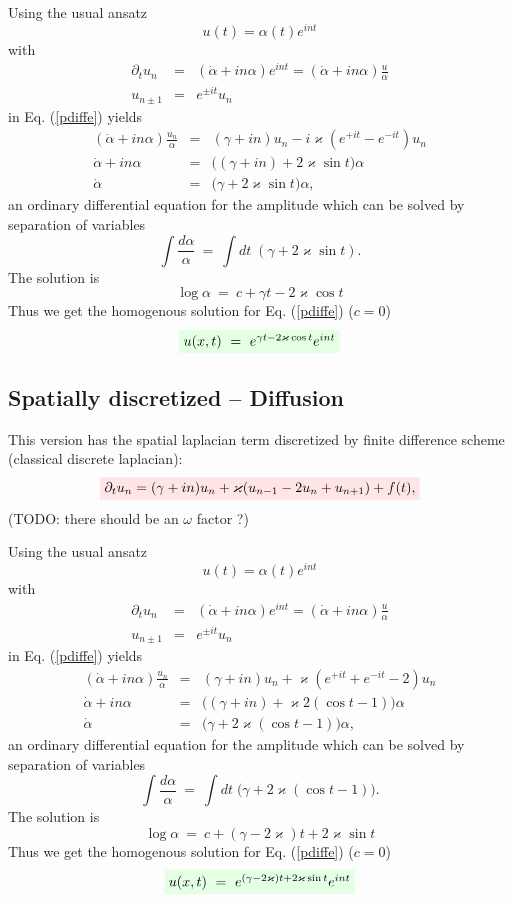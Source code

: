 \documentclass[11pt,twocolumn]{article}
\newcommand{\be}{\begin{equation}}
\newcommand{\ee}{\end{equation}}
\newcommand{\bea}{\begin{eqnarray*}}
\newcommand{\eea}{\end{eqnarray*}}
\newcommand{\w}{\omega}
\newcommand{\ka}{\varkappa}
\newcommand{\rbox}[1]{\colorbox{red!10}{$#1$}}
\newcommand{\gbox}[1]{\colorbox{green!10}{$#1$}}
\begin{document}
Using the usual ansatz
\be
   u(t) = \alpha(t) e^{int}
\ee
with
\bea
    \partial_t u_n       &=&  ( \dot{\alpha} + in\alpha ) e^{int} = ( \dot{\alpha} + in\alpha ) \frac{u}{\alpha}\\
              u_{n\pm 1} &=&  e^{\pm it} u_n
\eea
in Eq. (\ref{pdiffe}) yields
\bea
   ( \dot{\alpha} + in\alpha ) \frac{u_n}{\alpha}  &=&  (\gamma + i n) u_n - i \ka (e^{+it}-e^{-it}) u_n \\
     \dot{\alpha} + in\alpha  &=&  \big((\gamma + i n) + 2 \ka \sin t \big) \alpha \\
                \dot{\alpha}  &=&  \big( \gamma + 2 \ka \sin t \big) \alpha,
\eea
an ordinary differential equation for the amplitude which can be solved by separation of variables
\be
   \int\! \frac{d\alpha}{\alpha} \ =\  \int\!\! dt \; ( \gamma + 2\ka\sin t ).
\ee
The solution is
\be
   \log \alpha \ = \ c + \gamma t - 2\ka \cos t
\ee
Thus we get the homogenous solution for Eq. (\ref{pdiffe}) ($c=0$)
\be
   \gbox{u(x,t) \ = \ e^{\gamma t - 2\ka \cos t} e^{int}}
\ee





\subsection{Spatially discretized -- Diffusion}


This version has the spatial laplacian term discretized by finite difference scheme (classical discrete laplacian):
\be \label{pdiffe}
    \rbox{\partial_t u_n = (\gamma + i n) u_n + \ka ( u_{n-1} - 2u_n + u_{n+1} )  +  f(t),}
\ee
(TODO: there should be an $\w$ factor ?)

Using the usual ansatz
\be
   u(t) = \alpha(t) e^{int}
\ee
with
\bea
    \partial_t u_n       &=&  ( \dot{\alpha} + in\alpha ) e^{int} = ( \dot{\alpha} + in\alpha ) \frac{u}{\alpha}\\
              u_{n\pm 1} &=&  e^{\pm it} u_n
\eea
in Eq. (\ref{pdiffe}) yields
\bea
   ( \dot{\alpha} + in\alpha ) \frac{u_n}{\alpha}  &=&  (\gamma + i n) u_n + \ka (e^{+it}+e^{-it}-2) u_n \\
     \dot{\alpha} + in\alpha  &=&  \big((\gamma + i n) + \ka 2(\cos t-1) \big) \alpha \\
                \dot{\alpha}  &=&  \big( \gamma + 2\ka(\cos t-1) \big) \alpha,
\eea
an ordinary differential equation for the amplitude which can be solved by separation of variables
\be
   \int\! \frac{d\alpha}{\alpha} \ =\  \int\!\! dt \; \big( \gamma + 2\ka(\cos t-1) \big).
\ee
The solution is
\be
   \log \alpha \ = \ c + (\gamma-2\ka) t + 2\ka \sin t
\ee
Thus we get the homogenous solution for Eq. (\ref{pdiffe}) ($c=0$)
\be
   \gbox{u(x,t) \ = \ e^{(\gamma-2\ka) t + 2\ka \sin t} e^{int}}
\ee
\end{document}
